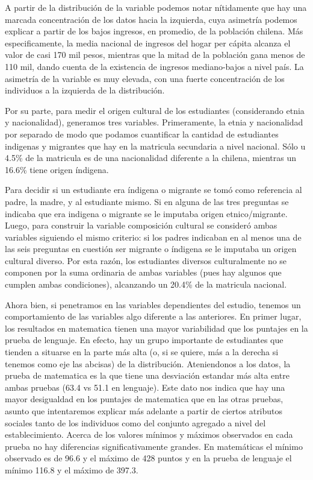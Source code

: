 \documentclass[
]{article}
\begin{document}
A partir de la distribución de la variable podemos notar nítidamente que
hay una marcada concentración de los datos hacia la izquierda, cuya
asimetría podemos explicar a partir de los bajos ingresos, en promedio,
de la población chilena. Más especificamente, la media nacional de
ingresos del hogar per cápita alcanza el valor de casi 170 mil pesos,
mientras que la mitad de la población gana menos de 110 mil, dando
cuenta de la existencia de ingresos mediano-bajos a nivel país. La
asimetría de la variable es muy elevada, con una fuerte concentración de
los individuos a la izquierda de la distribución.

Por su parte, para medir el origen cultural de los estudiantes
(considerando etnia y nacionalidad), generamos tres variables.
Primeramente, la etnia y nacionalidad por separado de modo que podamos
cuantificar la cantidad de estudiantes indigenas y migrantes que hay en
la matricula secundaria a nivel nacional. Sólo u 4.5\% de la matricula
es de una nacionalidad diferente a la chilena, mientras un 16.6\% tiene
origen índigena.

Para decidir si un estudiante era índigena o migrante se tomó como
referencia al padre, la madre, y al estudiante mismo. Si en alguna de
las tres preguntas se indicaba que era indigena o migrante se le
imputaba origen etnico/migrante. Luego, para construir la variable
composición cultural se consideró ambas variables siguiendo el mismo
criterio: si los padres indicaban en al menos una de las seis preguntas
en cuestión ser migrante o índigena se le imputaba un origen cultural
diverso. Por esta razón, los estudiantes diversos culturalmente no se
componen por la suma ordinaria de ambas variables (pues hay algunos que
cumplen ambas condiciones), alcanzando un 20.4\% de la matricula
nacional.

Ahora bien, si penetramos en las variables dependientes del estudio,
tenemos un comportamiento de las variables algo diferente a las
anteriores. En primer lugar, los resultados en matematica tienen una
mayor variabilidad que los puntajes en la prueba de lenguaje. En efecto,
hay un grupo importante de estudiantes que tienden a situarse en la
parte más alta (o, si se quiere, más a la derecha si tenemos como eje
las abcisas) de la distribución. Ateniendonos a los datos, la prueba de
matematica es la que tiene una desviación estandar más alta entre ambas
pruebas (63.4 vs 51.1 en lenguaje). Este dato nos indica que hay una
mayor desigualdad en los puntajes de matematica que en las otras
pruebas, asunto que intentaremos explicar más adelante a partir de
ciertos atributos sociales tanto de los individuos como del conjunto
agregado a nivel del establecimiento. Acerca de los valores mínimos y
máximos observados en cada prueba no hay diferencias significativamente
grandes. En matemáticas el mínimo observado es de 96.6 y el máximo de
428 puntos y en la prueba de lenguaje el mínimo 116.8 y el máximo de
397.3.
\end{document}
